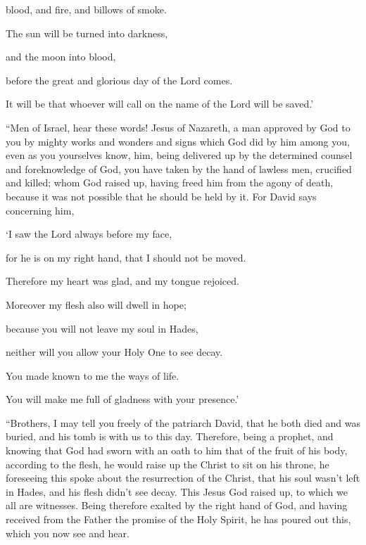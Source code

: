 {\par }{\QB blood, and fire, and billows of smoke.
\par }{\Q {}The sun will be turned into darkness,
\par }{\QB and the moon into blood,
\par }{\QB before the great and glorious day of the Lord comes.
\par }{\Q {}It will be that whoever will call on the name of the Lord will be saved.’
\par }{\PP {}“Men of Israel, hear these words! Jesus of Nazareth, a man approved by God to you by mighty works and wonders and signs which God did by him among you, even as you yourselves know,
him, being delivered up by the determined counsel and foreknowledge of God, you have taken by the hand of lawless men, crucified and killed;
whom God raised up, having freed him from the agony of death, because it was not possible that he should be held by it.
For David says concerning him,
\par }{\Q ‘I saw the Lord always before my face,
\par }{\QB for he is on my right hand, that I should not be moved.
\par }{\Q {}Therefore my heart was glad, and my tongue rejoiced.
\par }{\QB Moreover my flesh also will dwell in hope;
\par }{\Q {}because you will not leave my soul in Hades,
\par }{\QB neither will you allow your Holy One to see decay.
\par }{\Q {}You made known to me the ways of life.
\par }{\QB You will make me full of gladness with your presence.’
\par }{\PP {}“Brothers, I may tell you freely of the patriarch David, that he both died and was buried, and his tomb is with us to this day.
Therefore, being a prophet, and knowing that God had sworn with an oath to him that of the fruit of his body, according to the flesh, he would raise up the Christ to sit on his throne,
he foreseeing this spoke about the resurrection of the Christ, that his soul wasn’t left in Hades, and his flesh didn’t see decay.
This Jesus God raised up, to which we all are witnesses.
Being therefore exalted by the right hand of God, and having received from the Father the promise of the Holy Spirit, he has poured out this, which you now see and hear.
}
